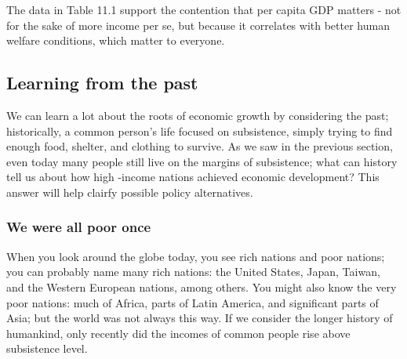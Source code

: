 \documentclass[11pt]{article} %
\theoremstyle{plain}
\theoremstyle{definition}
\begin{document}
The data in Table 11.1 support the contention that per capita GDP matters - not for the sake of more income per se, but because it correlates with better human welfare conditions, which matter to everyone.

\subsection*{Learning from the past}

We can learn a lot about the roots of economic growth by considering the past; historically, a common person's life focused on subsistence, simply trying to find enough food, shelter, and clothing to survive. As we saw in the previous section, even today many people still live on the margins of subsistence; what can history tell us about how high -income nations achieved economic development? This answer will help clairfy possible policy alternatives.

\subsubsection*{We were all poor once}
When you look around the globe today, you see rich nations and poor nations; you can probably name many rich nations: the United States, Japan, Taiwan, and the Western European nations, among others. You might also know the very poor nations: much of Africa, parts of Latin America, and significant parts of Asia; but the world was not always this way. If we consider the longer history of humankind, only recently did the incomes of common people rise above subsistence level.
\end{document}
